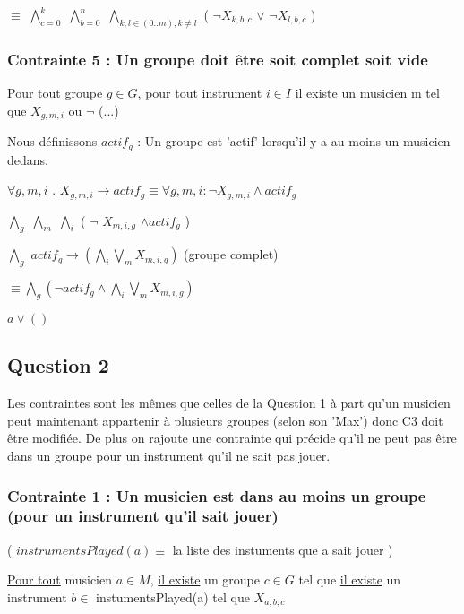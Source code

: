 \documentclass[a4paper,10pt]{report}
\begin{document}
$\equiv$ $\bigwedge \limits_{c=0}^{k}$ $\bigwedge \limits_{b=0}^{n}$  $\bigwedge \limits_{k,l \in (0..m); k\neq l}$ ( $\neg X_{k,b,c}$ $\vee $ $ \neg X_{l,b,c}$ ) 
 
 
\subsubsection{Contrainte 5 : Un groupe doit être soit complet soit vide} 
 
\underline{Pour tout} groupe $g \in G$, \underline{pour tout} instrument $i \in I$ \underline{il existe} un musicien m tel que $X_{g,m,i}$  \underline{ou} $\neg$ (...)


Nous définissons $actif_g$ : Un groupe est 'actif' lorsqu'il y a au moins un musicien dedans.

$\forall g,m,i$ . $X_{g,m,i} \rightarrow actif_g \equiv \forall g,m,i : \neg X_{g,m,i} \wedge actif_g$

$\bigwedge \limits_{g}$ $\bigwedge \limits_{m}$ $\bigwedge \limits_{i}$ ( $\neg$ $X_{m,i,g}$ $\wedge actif_g $ )
 
$\bigwedge \limits_{g}$ $actif_g \rightarrow (\bigwedge \limits_{i} \bigvee \limits_{m} X_{m,i,g})$  (groupe complet)

$\equiv \bigwedge \limits_{g} ( \neg actif_g \wedge \bigwedge \limits_{i} \bigvee \limits_{m} X_{m,i,g}) $

$ a \vee () $
 
 
\subsection{Question 2}

Les contraintes sont les mêmes que celles de la Question 1 à part qu'un musicien peut maintenant appartenir à plusieurs groupes (selon son 'Max') donc C3 doit être modifiée.
De plus on rajoute une contrainte qui précide qu'il ne peut pas être dans un groupe pour un instrument qu'il ne sait pas jouer.
 
 
\subsubsection{Contrainte 1 : Un musicien est dans au moins un groupe (pour un instrument qu'il sait jouer)}


( $instrumentsPlayed(a) \equiv$ la liste des instuments que a sait jouer )


\underline{Pour tout} musicien $a \in M $, \underline{il existe} un groupe $c \in G$ tel que \underline{il existe} un instrument $b \in$ instumentsPlayed(a)  tel que $X_{a,b,c}$
\end{document}
